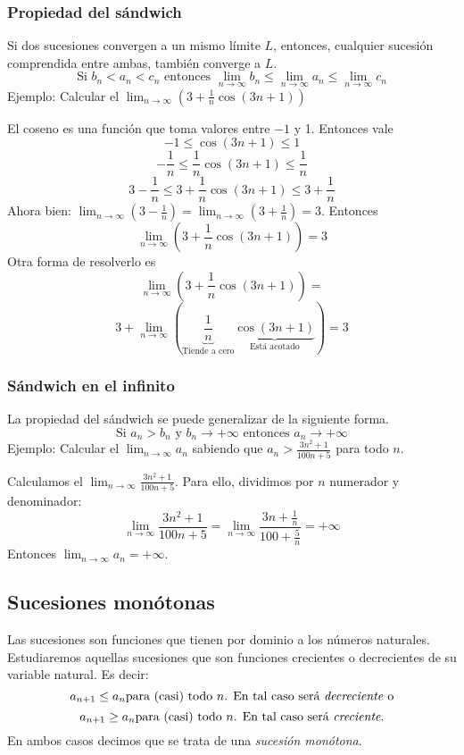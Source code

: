 \documentclass[../teoria.root.tex]{subfiles}
\begin{document}
\subsubsection{Propiedad del sándwich}
Si dos sucesiones convergen a un mismo límite \(L\), entonces, cualquier sucesión comprendida entre ambas, también converge a \(L\).
\[\text{Si }b_n<a_n<c_n\text{ entonces }\lim_{n\to\infty}b_n\leq\lim_{n\to\infty}a_n\leq\lim_{n\to\infty}c_n\]
Ejemplo: Calcular el \(\lim_{n\to\infty}\left(3+\frac{1}{n}\cos(3n+1)\right)\)

El coseno es una función que toma valores entre \(-1\) y 1.
Entonces vale
\[-1\leq\cos(3n+1)\leq1\]
\[-\frac{1}{n}\leq\frac{1}{n}\cos(3n+1)\leq\frac{1}{n}\]
\[3-\frac{1}{n}\leq3+\frac{1}{n}\cos(3n+1)\leq3+\frac{1}{n}\]
Ahora bien: \(\lim_{n\to\infty}\left(3-\frac{1}{n}\right)=\lim_{n\to\infty}\left(3+\frac{1}{n}\right)=3\).
Entonces \[\lim_{n\to\infty}\left(3+\frac{1}{n}\cos(3n+1)\right)=3\]
Otra forma de resolverlo es
\[\lim_{n\to\infty}\left(3+\frac{1}{n}\cos(3n+1)\right)=\]
\[3+\lim_{n\to\infty}\left(\underbrace{\frac{1}{n}}_{\text{Tiende a cero}}\underbrace{\cos(3n+1)}_{\text{Está acotado}}\right)=3\]
\subsubsection{Sándwich en el infinito}
La propiedad del sándwich se puede generalizar de la siguiente forma.
\[\text{Si }a_n>b_n\text{ y }b_n\rightarrow+\infty\text{ entonces }a_n\rightarrow+\infty\]
Ejemplo: Calcular el \(\lim_{n\to\infty}a_n\) sabiendo que \(a_n>\frac{3n^2+1}{100n+5}\) para todo \(n\).

Calculamos el \(\lim_{n\to\infty}\frac{3n^2+1}{100n+5}\).
Para ello, dividimos por \(n\) numerador y denominador:
\[\lim_{n\to\infty}\frac{3n^2+1}{100n+5}=\lim_{n\to\infty}\frac{3n+\frac{1}{n}}{100+\frac{5}{n}}=+\infty\]
Entonces \(\lim_{n\to\infty}a_n=+\infty\).
\subsection{Sucesiones monótonas}
Las sucesiones son funciones que tienen por dominio a los números naturales.
Estudiaremos aquellas sucesiones que son funciones crecientes o decrecientes de su variable natural.
Es decir:
\[a_{n+1}\leq a_n \text{para (casi) todo \(n\). En tal caso será \textit{decreciente} o}\]
\[a_{n+1}\geq a_n \text{para (casi) todo \(n\). En tal caso será \textit{creciente}.}\]
En ambos casos decimos que se trata de una \textit{sucesión monótona}.
\end{document}
